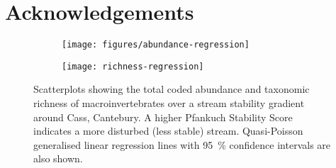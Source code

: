 \documentclass[a4paper,10pt]{article}
\begin{document}
\section*{Acknowledgements}

\clearpage

\begin{figure}[p]
	\centering
	\begin{subfigure}[t]{\textwidth}
		\centering
		\texttt{[image: figures/abundance-regression]}
		\caption{}\label{fig:abundance-regression}
	\end{subfigure}
	\begin{subfigure}[t]{\textwidth}
		\centering
		\texttt{[image: richness-regression]}
		\caption{}\label{fig:richness-regression}
	\end{subfigure}
	\caption[Regression plots]{ %
		Scatterplots showing the total coded abundance and taxonomic richness of macroinvertebrates over a stream stability gradient around Cass, Cantebury.
		A higher Pfankuch Stability Score indicates a more disturbed (less stable) stream.
		Quasi-Poisson generalised linear regression lines with \SI{95}{\percent} confidence intervals are also shown.
	}\label{fig:regressions}
\end{figure}



\FloatBarrier
\printbibliography
\end{document}
